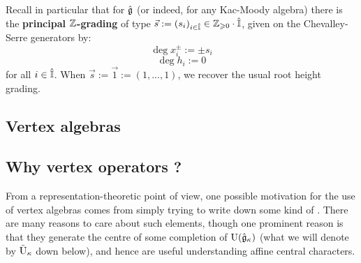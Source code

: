         Recall in particular that for $\hat{\mathfrak{g}}$ (or indeed, for any Kac-Moody algebra) there is the \textbf{principal $\mathbb{Z}$-grading} of type $\vec{s} := (s_i)_{i \in \hat{\mathbb{I}}} \in \mathbb{Z}_{\geqslant 0} \cdot \hat{\mathbb{I}}$, given on the Chevalley-Serre generators by:
            $$\deg x_i^{\pm} := \pm s_i$$
            $$\deg h_i := 0$$
        for all $i \in \hat{\mathbb{I}}$. When $\vec{s} := \vec{1} := (1, ..., 1)$, we recover the usual root height grading. 

    \subsection{Vertex algebras}

    \subsection{Why vertex operators ?}
        From a representation-theoretic point of view, one possible motivation for the use of vertex algebras comes from simply trying to write down some kind of . There are many reasons to care about such elements, though one prominent reason is that they generate the centre of some completion of $\mathrm{U}(\hat{\mathfrak{g}}_{\kappa})$ (what we will denote by $\tilde{\mathrm{U}}_{\kappa}$ down below), and hence are useful understanding affine central characters. 
        

